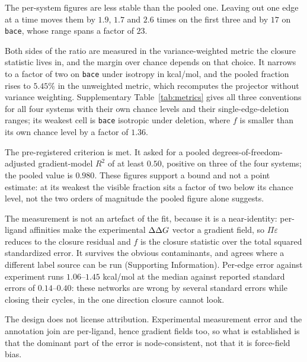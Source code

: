 The per-system figures are less stable than the pooled one. Leaving out one edge at a time moves
them by $1.9$, $1.7$ and $2.6$ times on the first three and by $17$ on \texttt{bace}, whose range
spans a factor of $23$.

Both sides of the ratio are measured in the variance-weighted metric the closure statistic lives
in, and the margin over chance depends on that choice. It narrows to a factor of two on
\texttt{bace} under isotropy in kcal/mol, and the pooled fraction rises to $5.45\%$ in the
unweighted metric, which recomputes the projector without variance weighting. Supplementary
Table~\ref{tab:metrics} gives all three conventions for all four systems with their own chance
levels and their single-edge-deletion ranges; its weakest cell is \texttt{bace} isotropic under
deletion, where $f$ is smaller than its own chance level by a factor of $1.36$.

The pre-registered criterion is met. It asked for a pooled degrees-of-freedom-adjusted
gradient-model $R^2$ of at least $0.50$, positive on three of the four systems; the pooled value is
$0.980$. These figures support a bound and not a point estimate: at its weakest the visible
fraction sits a factor of two below its chance level, not the two orders of magnitude the pooled
figure alone suggests.

The measurement is not an artefact of the fit, because it is a near-identity: per-ligand affinities
make the experimental $\Delta\Delta G$ vector a gradient field, so $\Pi\varepsilon$ reduces to the closure
residual and $f$ is the closure statistic over the total squared standardized error. It survives
the obvious contaminants, and agrees where a different label source can be run (Supporting
Information). Per-edge error against experiment runs $1.06$--$1.45$ kcal/mol at the median against
reported standard errors of $0.14$--$0.40$: these networks are wrong by several standard errors
while closing their cycles, in the one direction closure cannot look.

The design does not license attribution. Experimental measurement error and the annotation join are
per-ligand, hence gradient fields too, so what is established is that the dominant part of the
error is node-consistent, not that it is force-field bias.


